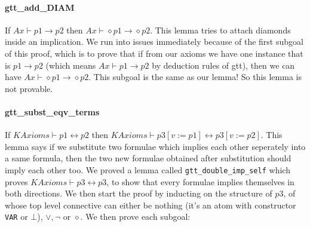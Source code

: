 \documentclass[submission,copyright,creativecommons]{eptcs}
\begin{document}
\paragraph{gtt\_add\_DIAM} If $Ax \vdash p1 \rightarrow p2$ then $Ax \vdash \diamond p1 \rightarrow \diamond p2$.
This lemma tries to attach diamonds inside an implication. 
We run into issues immediately because of the first subgoal of this 
proof, which is to prove that if from our axioms we have one instance that 
is $p1 \rightarrow p2$ (which means $Ax \vdash p1 \rightarrow p2$ by 
deduction rules of gtt), then we can have $Ax \vdash \diamond p1 \rightarrow \diamond p2$.
This subgoal is the same as our lemma! So this lemma is not provable. 

\paragraph{gtt\_subst\_eqv\_terms} If $KAxioms \vdash p1 \leftrightarrow p2$ 
then $KAxioms \vdash p3[v:=p1] \leftrightarrow p3[v:=p2]$. This 
lemma says if we substitute two formulae which implies each other seperately 
into a same formula, then the two new formulae obtained after substitution 
should imply each other too. We proved a lemma called \texttt{gtt\_double\_imp\_self} 
which proves $KAxioms \vdash p3 \leftrightarrow p3$, to show that 
every formulae implies themselves in both directions. We then start the 
proof by inducting on the structure of $p3$, of whose top level 
connective can either be nothing (it's an atom with constructor \texttt{VAR}
or $\bot$), $\vee, \neg$ or $\diamond$. We then prove each subgoal:
\end{document}
